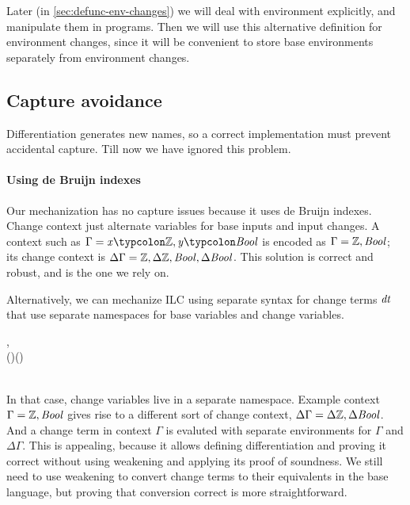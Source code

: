 Later (in \cref{sec:defunc-env-changes}) we will deal with
environment explicitly, and manipulate them in programs. Then we
will use this alternative definition for environment changes,
since it will be convenient to store base environments separately
from environment changes.

\subsection{Capture avoidance}
\label{sec:derive-binding-issues}
Differentiation generates new names, so a correct implementation
must prevent accidental capture. Till now we have ignored this problem.

\paragraph{Using de Bruijn indexes}
Our mechanization has no capture
issues because it uses de Bruijn indexes. Change context just
alternate variables for base inputs and input changes. A context
such as \ensuremath{\Gamma\mathrel{=}\Varid{x}\typcolon\mathbb{Z},\Varid{y}\typcolon\Conid{Bool}} is encoded as \ensuremath{\Gamma\mathrel{=}\mathbb{Z},\Conid{Bool}}; its change context is \ensuremath{\Delta \Gamma\mathrel{=}\mathbb{Z},\Delta \mathbb{Z},\Conid{Bool},\Delta \Conid{Bool}}. This solution is correct and robust, and is the one we
rely on.

Alternatively, we can mechanize ILC using separate syntax for change terms \ensuremath{\Varid{dt}}
that use separate namespaces for base variables and change variables.

\begin{hscode}\SaveRestoreHook
{}%
%
%
%
%
%
\>[3]{},\<[13]%
\>[13]{}\mathbin{::=}{}\<[13E]%
\>[18]{}\<[E]%
\\
\>[13]{}\mid {}\<[13E]%
\>[18]{}\lambda (\typcolon\sigma)\;(\typcolon\Delta \sigma)\to {}\<[E]%
\\
\>[13]{}\mid {}\<[13E]%
\>[18]{}\;\;\<[E]%
\\
\>[13]{}\mid {}\<[13E]%
\>[18]{}\<[E]%
\ColumnHook
\end{hscode}\resethooks

In that case, change variables live in a separate namespace. Example context
\ensuremath{\Gamma\mathrel{=}\mathbb{Z},\Conid{Bool}} gives rise to a different sort of change context, \ensuremath{\Delta \Gamma\mathrel{=}\Delta \mathbb{Z},\Delta \Conid{Bool}}. And a change term in context \ensuremath{\Gamma} is evaluted with
separate environments for \ensuremath{\Gamma} and \ensuremath{\Delta \Gamma}.
This is appealing, because it allows defining differentiation and proving it
correct without using weakening and applying its proof of soundness.
We still need to use weakening to convert change terms to their equivalents in
the base language, but proving that conversion correct is more straightforward.

